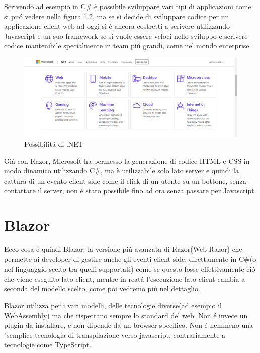 Scrivendo ad esempio in C\# \`e possibile sviluppare vari tipi di applicazioni come si pu\'o vedere nella figura 1.2, ma se si decide di sviluppare codice per un applicazione client web ad oggi si \`e ancora costretti a scrivere utilizzando Javascript e un suo framework se si vuole essere veloci nello sviluppo e scrivere codice mantenibile specialmente in team pi\'u grandi, come nel mondo enterprise.

\begin{figure}[H]
\centerline{\includegraphics[scale=0.35]{figure/DotNetFrameworkCapabilities}}
\caption{Possibilit\'a di .NET}
\label{fig:DotNetCapabilities}
\end{figure}

Gi\'a con Razor\cite{razor}, Microsoft ha permesso la generazione di codice HTML e CSS in modo dinamico utilizzando C\#, ma \`e utilizzabile solo lato server e quindi la cattura di un evento client side come il click di un utente su un bottone, senza contattare il server, non \`e stato possibile fino ad ora senza passare per Javascript.

\section{Blazor}
Ecco cosa \'e quindi Blazor: la versione pi\'u avanzata di Razor(Web-Razor) che permette ai developer di gestire anche gli eventi client-side, direttamente in C\#(o nel linguaggio scelto tra quelli supportati) come se questo fosse effettivamente ci\'o che viene eseguito lato client, mentre in reat\'a l'esecuzione lato client cambia a seconda del modello scelto, come poi vedremo pi\'u nel dettaglio.

Blazor utilizza per i vari modelli, delle tecnologie diverse(ad esempio il WebAssembly) ma che rispettano sempre lo standard del web.
Non \'e invece un plugin da installare, e non dipende da un browser specifico.
Non \'e nemmeno una "semplice tecnologia di transpilazione verso javascript, contrariamente a tecnologie come TypeScript.